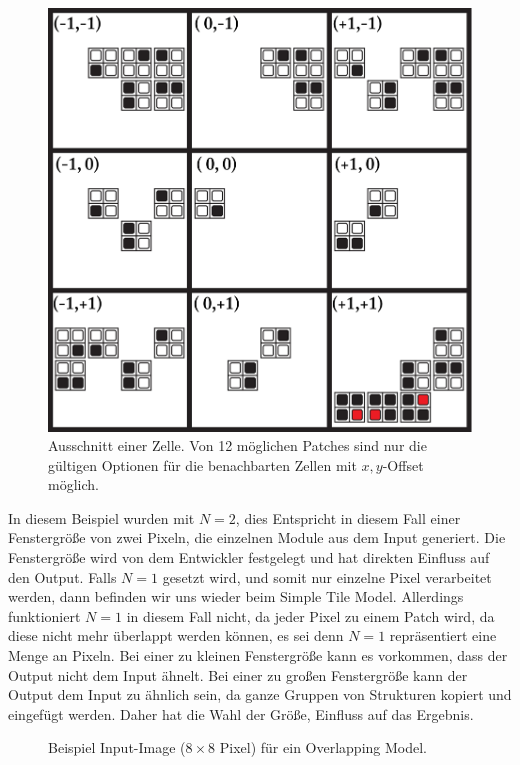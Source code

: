\documentclass[12pt, a4paper,twoside,openright]{report} %
\begin{document}
\begin{figure}[H]
    \centering
    \includegraphics[width=0.5\linewidth]{images/red-maze-offset-example.png}%
    \caption{Ausschnitt einer Zelle. Von 12 möglichen Patches sind nur die gültigen Optionen für die benachbarten Zellen mit $x,y$-Offset möglich. \cite{Karth2017WaveFunctionCollapseIC}}%
\end{figure}

In diesem Beispiel wurden mit $N = 2$, dies Entspricht in diesem Fall einer Fenstergröße von zwei Pixeln, die einzelnen Module aus dem Input generiert.
Die Fenstergröße wird von dem Entwickler festgelegt und hat direkten Einfluss auf den Output.
Falls $N = 1$ gesetzt wird, und somit nur einzelne Pixel verarbeitet werden, dann befinden wir uns wieder beim Simple Tile Model.
Allerdings funktioniert $N = 1$ in diesem Fall nicht, da jeder Pixel zu einem Patch wird, da diese nicht mehr überlappt werden können,
es sei denn $N = 1$ repräsentiert eine Menge an Pixeln.
Bei einer zu kleinen Fenstergröße kann es vorkommen, dass der Output nicht dem Input ähnelt.
Bei einer zu großen Fenstergröße kann der Output dem Input zu ähnlich sein, da ganze Gruppen von Strukturen kopiert und eingefügt werden.
Daher hat die Wahl der Größe, Einfluss auf das Ergebnis.

\begin{figure}[H]
    \centering
    \caption{Beispiel Input-Image ($8\times8$ Pixel) für ein Overlapping Model.}%
\end{figure}
\end{document}
